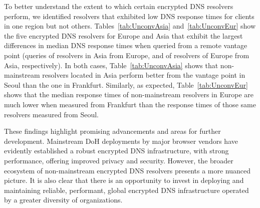 To better understand the extent to which certain encrypted DNS resolvers
perform, we identified
resolvers that exhibited low DNS response times for clients in one region
but not others. 
Tables~\ref{tab:UnconvAsia} and~\ref{tab:UnconvEur} show 
the five encrypted DNS resolvers for Europe and Asia that exhibit the 
largest differences in median DNS response times when
queried from a remote vantage point (queries of resolvers in Asia from Europe,
and of resolvers of Europe from Asia, respectively). In both cases, 
Table~\ref{tab:UnconvAsia} shows that non-mainstream resolvers located
in Asia perform better from the vantage point in Seoul than the one in
Frankfurt.  Similarly, as expected, Table~\ref{tab:UnconvEur} shows that the
median response times of non-mainstream resolvers in Europe are much lower when
measured from Frankfurt than the response times of those same resolvers
measured from Seoul.

These findings highlight promising advancements and areas for further development. Mainstream DoH deployments by major browser vendors have evidently established a robust encrypted DNS infrastructure, with strong performance, offering improved privacy and security. However, the broader ecosystem of non-mainstream encrypted DNS resolvers presents a more nuanced picture. 
It is also clear that there is an opportunity
to invest in deploying and maintaining reliable, performant, global encrypted
DNS infrastructure operated by a greater diversity of organizations.

